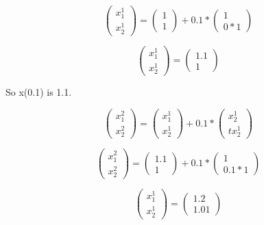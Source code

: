 \documentclass[]{article}
\begin{document}
\[
\left(\begin{array}{c} 
x_1^1\\
x_2^1
\end{array}\right)=
\left(\begin{array}{c} 
1 \\
1 
\end{array}\right) + 0.1 *
\left(\begin{array}{c}
1 \\
0 * 1 
\end{array}\right)
\]

\[
\left(\begin{array}{c} 
x_1^1\\
x_2^1
\end{array}\right)=
\left(\begin{array}{c} 
1.1 \\
1 
\end{array}\right)
\]

So x(0.1) is 1.1.

\[
\left(\begin{array}{c} 
x_1^2\\
x_2^2
\end{array}\right)=
\left(\begin{array}{c} 
x_1^1 \\
x_2^1 
\end{array}\right) + 0.1 *
\left(\begin{array}{c}
x_2^1 \\
tx_2^1 
\end{array}\right)
\]

\[
\left(\begin{array}{c} 
x_1^2\\
x_2^2
\end{array}\right)=
\left(\begin{array}{c} 
1.1 \\
1 
\end{array}\right) + 0.1 *
\left(\begin{array}{c}
1 \\
0.1*1 
\end{array}\right)
\]

\[
\left(\begin{array}{c} 
x_1^1\\
x_2^1
\end{array}\right)=
\left(\begin{array}{c} 
1.2 \\
1.01 
\end{array}\right)
\]
\end{document}
